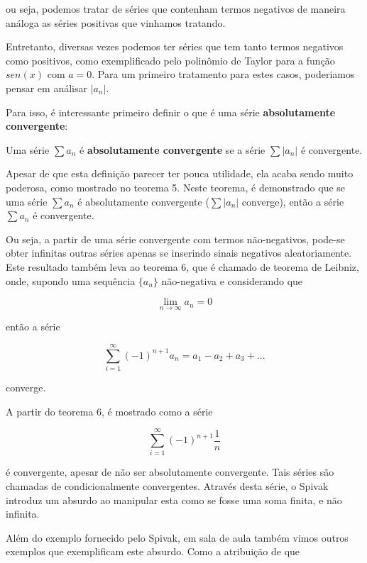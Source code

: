 \documentclass[a4paper, 12pt]{article}
\begin{document}
ou seja, podemos tratar de séries que contenham termos negativos de maneira análoga as séries
positivas que vinhamos tratando.

Entretanto, diversas vezes podemos ter séries que tem tanto termos negativos como positivos, 
como exemplificado pelo polinômio de Taylor para a função $sen(x)$ com $a=0$. Para um primeiro tratamento
para estes casos, poderiamos pensar em análisar $|a_n|$.

Para isso, é interessante primeiro definir o que é uma série \textbf{absolutamente convergente}:

Uma série $\sum a_n$ é \textbf{absolutamente convergente} se a série $\sum |a_n|$ é convergente.

Apesar de que esta definição parecer ter pouca utilidade, ela acaba sendo muito poderosa, como
mostrado no teorema 5. Neste teorema, é demonstrado que se uma série $\sum a_n$ é absolutamente convergente
($\sum |a_n|$ converge), então a série $\sum a_n$ é convergente.

Ou seja, a partir de uma série convergente com termos não-negativos, pode-se obter infinitas outras séries
apenas se inserindo sinais negativos aleatoriamente. Este resultado também leva ao teorema 6, que é chamado
de teorema de Leibniz, onde, supondo uma sequência $\{a_n\}$ não-negativa e considerando que

\begin{equation}
 \nonumber \lim_{n\to\infty} a_n = 0
\end{equation}

então a série


\begin{equation}
 \nonumber \sum_{i=1}^\infty (-1)^{n+1}a_n = a_1 - a_2 + a_3 + ... 
\end{equation}

converge. 

A partir do teorema 6, é mostrado como a série

\begin{equation}
 \nonumber \sum_{i=1}^\infty (-1)^{n+1} \frac{1}{n}
\end{equation}

é convergente, apesar de não ser absolutamente convergente. Tais séries são chamadas de 
condicionalmente convergentes. Através desta série, o Spivak introduz um absurdo ao manipular
esta como se fosse uma soma finita, e não infinita. 

Além do exemplo fornecido pelo Spivak, em sala de aula também vimos outros exemplos que 
exemplificam este absurdo. Como a atribuição de que
\end{document}
